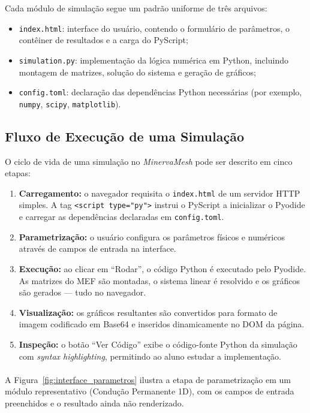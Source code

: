 Cada módulo de simulação segue um padrão uniforme de três arquivos:
\begin{itemize}
    \item \texttt{index.html}: interface do usuário, contendo o formulário de parâmetros, o contêiner de resultados e a carga do PyScript;
    \item \texttt{simulation.py}: implementação da lógica numérica em Python, incluindo montagem de matrizes, solução do sistema e geração de gráficos;
    \item \texttt{config.toml}: declaração das dependências Python necessárias (por exemplo, \texttt{numpy}, \texttt{scipy}, \texttt{matplotlib}).
\end{itemize}

\subsection{Fluxo de Execução de uma Simulação}
\label{sec:fluxo_execucao}

O ciclo de vida de uma simulação no \textit{MinervaMesh} pode ser descrito em cinco etapas:

\begin{enumerate}
    \item \textbf{Carregamento:} o navegador requisita o \texttt{index.html} de um servidor HTTP simples. A tag \texttt{<script type="py">} instrui o PyScript a inicializar o Pyodide e carregar as dependências declaradas em \texttt{config.toml}.
    \item \textbf{Parametrização:} o usuário configura os parâmetros físicos e numéricos através de campos de entrada na interface.
    \item \textbf{Execução:} ao clicar em ``Rodar'', o código Python é executado pelo Pyodide. As matrizes do MEF são montadas, o sistema linear é resolvido e os gráficos são gerados --- tudo no navegador.
    \item \textbf{Visualização:} os gráficos resultantes são convertidos para formato de imagem codificado em Base64 e inseridos dinamicamente no DOM da página.
    \item \textbf{Inspeção:} o botão ``Ver Código'' exibe o código-fonte Python da simulação com \textit{syntax highlighting}, permitindo ao aluno estudar a implementação.
\end{enumerate}

\paragraph{}A Figura~\ref{fig:interface_parametros} ilustra a etapa de parametrização em um módulo representativo (Condução Permanente 1D), com os campos de entrada preenchidos e o resultado ainda não renderizado.

